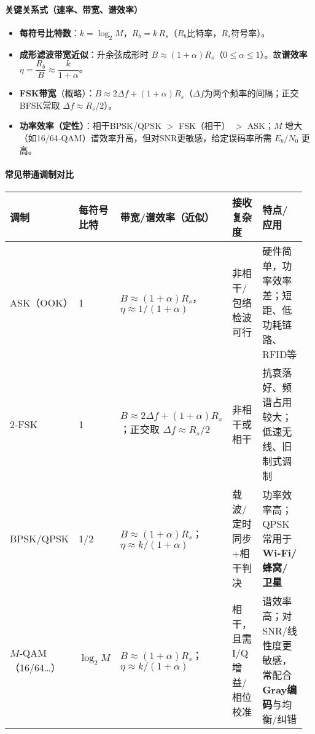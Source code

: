 \documentclass[lang=cn,newtx,10pt,scheme=chinese]{../../elegantbook}
\begin{document}
\paragraph{关键关系式（速率、带宽、谱效率）}
\begin{itemize}
    \item \textbf{每符号比特数}：$k=\log_2 M$，$R_b=k\,R_s$（$R_b$比特率，$R_s$符号率）。
    \item \textbf{成形滤波带宽近似}：升余弦成形时 $B\approx (1+\alpha)R_s$（$0\le\alpha\le1$）。故\textbf{谱效率} $\eta=\dfrac{R_b}{B}\approx\dfrac{k}{1+\alpha}$。
    \item \textbf{FSK带宽}（概略）：$B\approx 2\Delta f + (1+\alpha)R_s$（$\Delta f$为两个频率的间隔；正交BFSK常取 $\Delta f\approx R_s/2$）。
    \item \textbf{功率效率（定性）}：相干BPSK/QPSK $>$ FSK（相干） $>$ ASK；$M$ 增大（如16/64‑QAM）谱效率升高，但对SNR更敏感，给定误码率所需 $E_b/N_0$ 更高。
\end{itemize}

\paragraph{常见带通调制对比}
{\small\begin{longtable}{|p{0.16\linewidth}|p{0.16\linewidth}|p{0.24\linewidth}|p{0.20\linewidth}|p{0.20\linewidth}|}
\hline
	\textbf{调制} & \textbf{每符号比特} & \textbf{带宽/谱效率（近似）} & \textbf{接收复杂度} & \textbf{特点/应用} \\
\hline
ASK（OOK） & 1 & $B\approx (1+\alpha)R_s$，$\eta\approx 1/(1+\alpha)$ & 非相干/包络检波可行 & 硬件简单，功率效率差；短距、低功耗链路、RFID等 \\
\hline
2‑FSK & 1 & $B\approx 2\Delta f+(1+\alpha)R_s$；正交取 $\Delta f\!\approx\!R_s/2$ & 非相干或相干 & 抗衰落好、频谱占用较大；低速无线、旧制式调制 \\
\hline
BPSK/QPSK & 1/2 & $B\approx (1+\alpha)R_s$；$\eta\approx k/(1+\alpha)$ & 载波/定时同步+相干判决 & 功率效率高；QPSK常用于\textbf{Wi‑Fi/蜂窝/卫星} \\
\hline
$M$‑QAM（16/64…） & $\log_2 M$ & $B\approx (1+\alpha)R_s$；$\eta\approx k/(1+\alpha)$ & 相干，且需I/Q增益/相位校准 & 谱效率高；对SNR/线性度更敏感，常配合\textbf{Gray编码}与均衡/纠错 \\
\hline
\end{longtable}}
\end{document}
